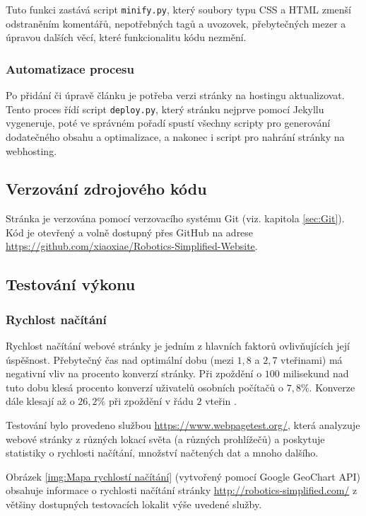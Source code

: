 \documentclass[a4paper, 12pt]{article}
\begin{document}
  Tuto funkci zastává script \texttt{minify.py}, který soubory typu CSS a HTML zmenší odstraněním komentářů, nepotřebných tagů a uvozovek, přebytečných mezer a úpravou dalších věcí, které funkcionalitu kódu nezmění.


  \subsubsection{Automatizace procesu}
  Po přidání či úpravě článku je potřeba verzi stránky na hostingu aktualizovat. Tento proces řídí script \texttt{deploy.py}, který stránku nejprve pomocí Jekyllu vygeneruje, poté ve správném pořadí spustí všechny scripty pro generování dodatečného obsahu a optimalizace, a nakonec i script pro nahrání stránky na webhosting.


  \subsection{Verzování zdrojového kódu}
  Stránka je verzována pomocí verzovacího systému Git (viz. kapitola \ref{sec:Git}). Kód je otevřený a volně dostupný přes GitHub na adrese \url{https://github.com/xiaoxiae/Robotics-Simplified-Website}.


  \subsection{Testování výkonu}

  \subsubsection{Rychlost načítání}
  Rychlost načítání webové stránky je jedním z hlavních faktorů ovlivňujících její úspěšnost. Přebytečný čas nad optimální dobu (mezi $1,8$ a $2,7$ vteřinami) má negativní vliv na procento konverzí stránky. Při zpoždění o $100$ milisekund nad tuto dobu klesá procento konverzí uživatelů osobních počítačů o $7,8 \%$. Konverze dále klesají až o $26,2 \%$ při zpoždění v řádu $2$ vteřin \cite{conversion-rate-statistics}.

  Testování bylo provedeno službou \url{https://www.webpagetest.org/}, která analyzuje webové stránky z různých lokací světa (a různých prohlížečů) a poskytuje statistiky o rychlosti načítání, množství načtených dat a mnoho dalšího.

  Obrázek \ref{img:Mapa rychlostí načítání} (vytvořený pomocí Google GeoChart API) obsahuje informace o rychlosti načítání stránky \url{http://robotics-simplified.com/} z většiny dostupných testovacích lokalit výše uvedené služby. %
\end{document}
